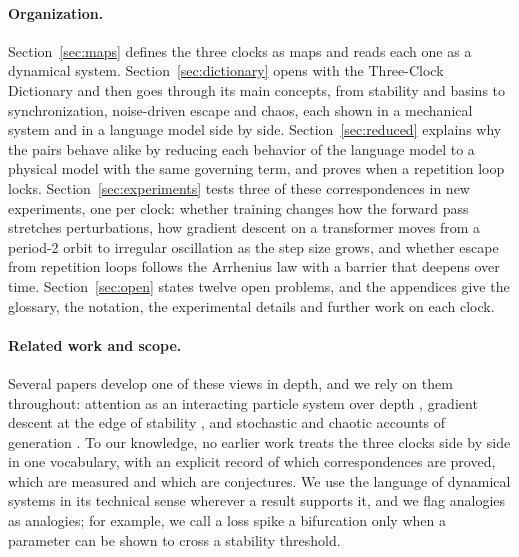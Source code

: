 \paragraph{Organization.} Section~\ref{sec:maps} defines the three clocks as maps and reads each one as a dynamical system. Section~\ref{sec:dictionary} opens with the Three-Clock Dictionary and then goes through its main concepts, from stability and basins to synchronization, noise-driven escape and chaos, each shown in a mechanical system and in a language model side by side. Section~\ref{sec:reduced} explains why the pairs behave alike by reducing each behavior of the language model to a physical model with the same governing term, and proves when a repetition loop locks. Section~\ref{sec:experiments} tests three of these correspondences in new experiments, one per clock: whether training changes how the forward pass stretches perturbations, how gradient descent on a transformer moves from a period-2 orbit to irregular oscillation as the step size grows, and whether escape from repetition loops follows the Arrhenius law with a barrier that deepens over time. Section~\ref{sec:open} states twelve open problems, and the appendices give the glossary, the notation, the experimental details and further work on each clock.

\paragraph{Related work and scope.} Several papers develop one of these views in depth, and we rely on them throughout: attention as an interacting particle system over depth \citep{geshkovski2023mathematical,castin2025unified}, gradient descent at the edge of stability \citep{cohen2021gradient}, and stochastic and chaotic accounts of generation \citep{krishnamurthy2026stochastic,jones2026chaos}. To our knowledge, no earlier work treats the three clocks side by side in one vocabulary, with an explicit record of which correspondences are proved, which are measured and which are conjectures. We use the language of dynamical systems in its technical sense wherever a result supports it, and we flag analogies as analogies; for example, we call a loss spike a bifurcation only when a parameter can be shown to cross a stability threshold.

